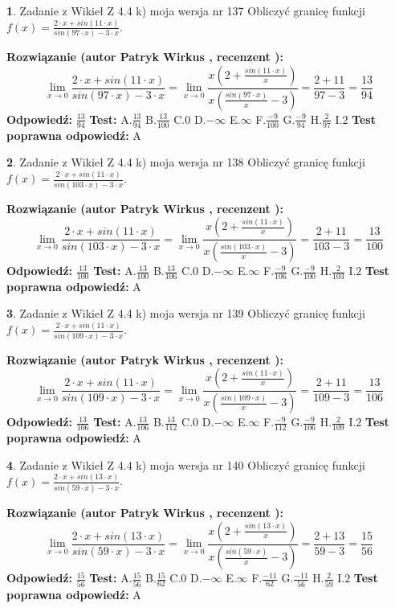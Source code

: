 \documentclass[12pt, a4paper]{article}
\theoremstyle{definition} %
\newtheorem{zad}{}
\newcommand{\zadStart}[1]{\begin{zad}#1\newline}
\newcommand{\zadStop}{\end{zad}}
\newcommand{\rozwStart}[2]{\noindent \textbf{Rozwiązanie (autor #1 , recenzent #2): }\newline}
\newcommand{\rozwStop}{\newline}
\newcommand{\odpStart}{\noindent \textbf{Odpowiedź:}\newline}
\newcommand{\odpStop}{\newline}
\newcommand{\testStart}{\noindent \textbf{Test:}\newline}
\newcommand{\testStop}{\newline}
\newcommand{\kluczStart}{\noindent \textbf{Test poprawna odpowiedź:}\newline}
\newcommand{\kluczStop}{\newline}
\begin{document}
\zadStart{Zadanie z Wikieł Z 4.4 k) moja wersja nr 137}
Obliczyć granicę funkcji $f(x)=\frac{2\cdot x +sin(11\cdot x)}{sin(97\cdot x) -3\cdot x}$.
\zadStop
\rozwStart{Patryk Wirkus}{}
$$\lim\limits_{x\to 0}\frac{2\cdot x +sin(11\cdot x)}{sin(97\cdot x) -3\cdot x}
=\lim\limits_{x\to 0}\frac{x(2+\frac{sin(11\cdot x)}{x})}{x(\frac{sin(97\cdot x)}{x}-3)}
=\frac{2+11}{97-3} = \frac{13}{94}$$
\rozwStop
\odpStart
$\frac{13}{94}$
\odpStop
\testStart
A.$\frac{13}{94}$
B.$\frac{13}{100}$
C.$0$
D.$-\infty$
E.$\infty$
F.$\frac{-9}{100}$
G.$\frac{-9}{94}$
H.$\frac{2}{97}$
I.$2$
\testStop
\kluczStart
A
\kluczStop



\zadStart{Zadanie z Wikieł Z 4.4 k) moja wersja nr 138}
Obliczyć granicę funkcji $f(x)=\frac{2\cdot x +sin(11\cdot x)}{sin(103\cdot x) -3\cdot x}$.
\zadStop
\rozwStart{Patryk Wirkus}{}
$$\lim\limits_{x\to 0}\frac{2\cdot x +sin(11\cdot x)}{sin(103\cdot x) -3\cdot x}
=\lim\limits_{x\to 0}\frac{x(2+\frac{sin(11\cdot x)}{x})}{x(\frac{sin(103\cdot x)}{x}-3)}
=\frac{2+11}{103-3} = \frac{13}{100}$$
\rozwStop
\odpStart
$\frac{13}{100}$
\odpStop
\testStart
A.$\frac{13}{100}$
B.$\frac{13}{106}$
C.$0$
D.$-\infty$
E.$\infty$
F.$\frac{-9}{106}$
G.$\frac{-9}{100}$
H.$\frac{2}{103}$
I.$2$
\testStop
\kluczStart
A
\kluczStop



\zadStart{Zadanie z Wikieł Z 4.4 k) moja wersja nr 139}
Obliczyć granicę funkcji $f(x)=\frac{2\cdot x +sin(11\cdot x)}{sin(109\cdot x) -3\cdot x}$.
\zadStop
\rozwStart{Patryk Wirkus}{}
$$\lim\limits_{x\to 0}\frac{2\cdot x +sin(11\cdot x)}{sin(109\cdot x) -3\cdot x}
=\lim\limits_{x\to 0}\frac{x(2+\frac{sin(11\cdot x)}{x})}{x(\frac{sin(109\cdot x)}{x}-3)}
=\frac{2+11}{109-3} = \frac{13}{106}$$
\rozwStop
\odpStart
$\frac{13}{106}$
\odpStop
\testStart
A.$\frac{13}{106}$
B.$\frac{13}{112}$
C.$0$
D.$-\infty$
E.$\infty$
F.$\frac{-9}{112}$
G.$\frac{-9}{106}$
H.$\frac{2}{109}$
I.$2$
\testStop
\kluczStart
A
\kluczStop



\zadStart{Zadanie z Wikieł Z 4.4 k) moja wersja nr 140}
Obliczyć granicę funkcji $f(x)=\frac{2\cdot x +sin(13\cdot x)}{sin(59\cdot x) -3\cdot x}$.
\zadStop
\rozwStart{Patryk Wirkus}{}
$$\lim\limits_{x\to 0}\frac{2\cdot x +sin(13\cdot x)}{sin(59\cdot x) -3\cdot x}
=\lim\limits_{x\to 0}\frac{x(2+\frac{sin(13\cdot x)}{x})}{x(\frac{sin(59\cdot x)}{x}-3)}
=\frac{2+13}{59-3} = \frac{15}{56}$$
\rozwStop
\odpStart
$\frac{15}{56}$
\odpStop
\testStart
A.$\frac{15}{56}$
B.$\frac{15}{62}$
C.$0$
D.$-\infty$
E.$\infty$
F.$\frac{-11}{62}$
G.$\frac{-11}{56}$
H.$\frac{2}{59}$
I.$2$
\testStop
\kluczStart
A
\kluczStop
\end{document}
